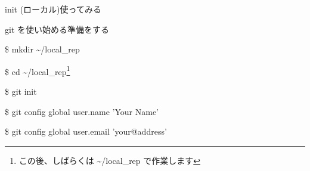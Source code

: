 % 
% 
% 
% 

\begin{frame}[t]{init (ローカル)}{使ってみる}

  git を使い始める準備をする
  \vspace{4ex}

  \$ mkdir \~{}/local\_rep

  \$ cd \~{}/local\_rep\footnote{この後、しばらくは \~{}/local\_rep で作業します}

  \$ git init

  \$ git config {\dhyphen}global user.name 'Your Name'

  \$ git config {\dhyphen}global user.email 'your@address'

\end{frame}

